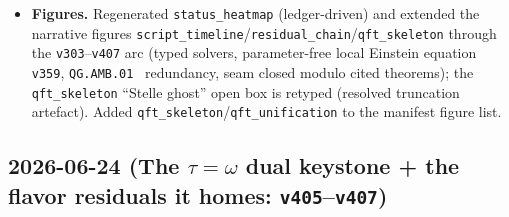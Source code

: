 \documentclass[11pt]{article}
\begin{document}
\begin{itemize}
\item \textbf{Figures.} Regenerated \texttt{status\_heatmap} (ledger-driven) and extended the narrative figures \texttt{script\_timeline}/\texttt{residual\_chain}/\texttt{qft\_skeleton} through the \texttt{v303}--\texttt{v407} arc (typed solvers, parameter-free local Einstein equation \texttt{v359}, \texttt{QG.AMB.01} \mC\ redundancy, seam closed modulo cited theorems); the \texttt{qft\_skeleton} ``Stelle ghost'' open box is retyped (resolved truncation artefact). Added \texttt{qft\_skeleton}/\texttt{qft\_unification} to the manifest figure list.
\end{itemize}

\subsection*{2026-06-24 (The $\tau{=}\omega$ dual keystone + the flavor residuals it homes: \texttt{v405}--\texttt{v407})}
\end{document}
